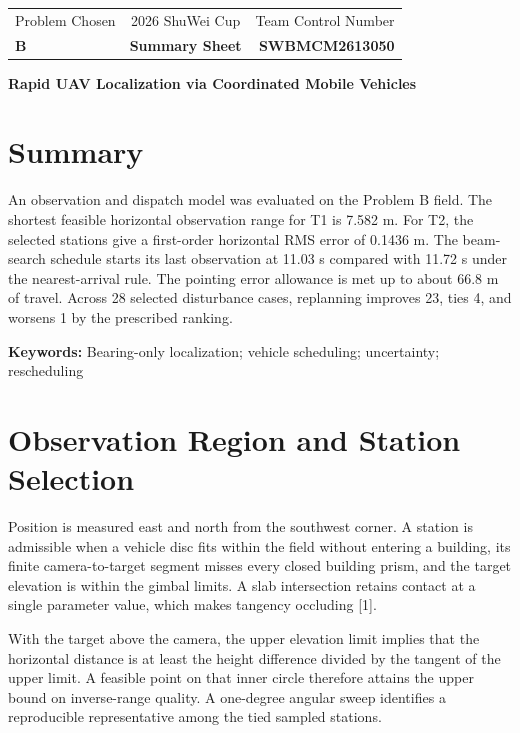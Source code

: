 \documentclass[12pt,a4paper]{article}
\newcommand{\ProblemLetter}{B}
\newcommand{\TeamNumber}{SWBMCM2613050}
\newcommand{\PaperTitle}{Rapid UAV Localization via Coordinated Mobile Vehicles}
\begin{document}
\pagestyle{fancy}
\thispagestyle{empty}
\begin{center}
\begin{tabular*}{\textwidth}{@{\extracolsep{\fill}}lcr@{}}
  \toprule
  Problem Chosen & 2026 ShuWei Cup & Team Control Number\\
  \textbf{\ProblemLetter} & \textbf{Summary Sheet} & \textbf{\TeamNumber}\\
  \bottomrule
\end{tabular*}

\vspace{1em}
{\Large\bfseries\PaperTitle}
\end{center}
\section*{Summary}
An observation and dispatch model was evaluated on the Problem B field. The shortest feasible horizontal observation range for T1 is 7.582 m. For T2, the selected stations give a first-order horizontal RMS error of 0.1436 m. The beam-search schedule starts its last observation at 11.03 s compared with 11.72 s under the nearest-arrival rule. The pointing error allowance is met up to about 66.8 m of travel. Across 28 selected disturbance cases, replanning improves 23, ties 4, and worsens 1 by the prescribed ranking.

\noindent\textbf{Keywords:} Bearing-only localization; vehicle scheduling; uncertainty; rescheduling

\clearpage
\tableofcontents
\clearpage

\section{Observation Region and Station Selection}

Position is measured east and north from the southwest corner. A station is admissible when a vehicle disc fits within the field without entering a building, its finite camera-to-target segment misses every closed building prism, and the target elevation is within the gimbal limits. A slab intersection retains contact at a single parameter value, which makes tangency occluding [1].

With the target above the camera, the upper elevation limit implies that the horizontal distance is at least the height difference divided by the tangent of the upper limit. A feasible point on that inner circle therefore attains the upper bound on inverse-range quality. A one-degree angular sweep identifies a reproducible representative among the tied sampled stations.
\end{document}
